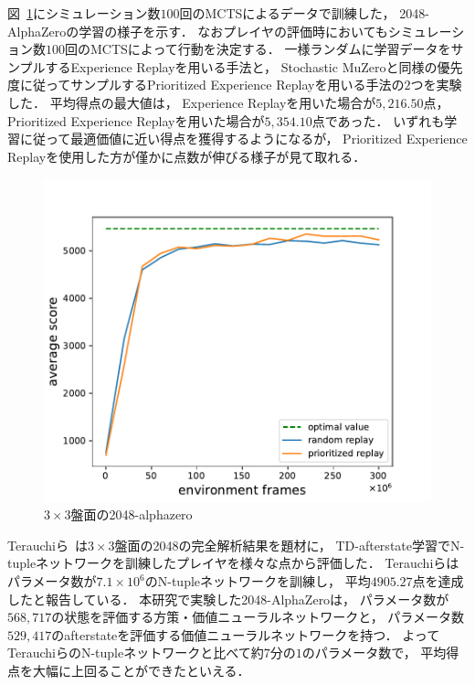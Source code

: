 図~\ref{fig:alphazero_3x3}にシミュレーション数$100$回のMCTSによるデータで訓練した， 2048-AlphaZeroの学習の様子を示す．
なおプレイヤの評価時においてもシミュレーション数$100$回のMCTSによって行動を決定する．
一様ランダムに学習データをサンプルするExperience Replayを用いる手法と， Stochastic MuZeroと同様の優先度に従ってサンプルするPrioritized Experience Replayを用いる手法の$2$つを実験した．
平均得点の最大値は， Experience Replayを用いた場合が$5,216.50$点， Prioritized Experience Replayを用いた場合が$5,354.10$点であった．
いずれも学習に従って最適価値に近い得点を獲得するようになるが， Prioritized Experience Replayを使用した方が僅かに点数が伸びる様子が見て取れる．
\begin{figure}[t]
    \centering
    \includegraphics[width=0.7\linewidth{}]{figures/alphazero_3x3.pdf}
    \caption{$3\times3$盤面の2048-alphazero}
    \label{fig:alphazero_3x3}
\end{figure}

Terauchiら~\cite{Min2048_matsuzaki}は$3\times3$盤面の2048の完全解析結果を題材に， TD-afterstate学習でN-tupleネットワークを訓練したプレイヤを様々な点から評価した．
Terauchiらはパラメータ数が$7.1\times{10}^6$のN-tupleネットワークを訓練し， 平均$4905.27$点を達成したと報告している．
本研究で実験した2048-AlphaZeroは， パラメータ数が$568,717$の状態を評価する方策・価値ニューラルネットワークと， パラメータ数$529,417$のafterstateを評価する価値ニューラルネットワークを持つ．
よってTerauchiらのN-tupleネットワークと比べて約$7$分の$1$のパラメータ数で， 平均得点を大幅に上回ることができたといえる．
